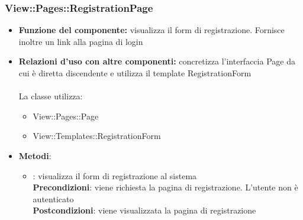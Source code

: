 \subsubsection{View::Pages::RegistrationPage}
\begin{itemize}
\item\textbf{Funzione del componente:} visualizza il form di registrazione. Fornisce inoltre un link alla pagina di login
				\item\textbf{Relazioni d'uso con altre componenti:} concretizza l'interfaccia Page da cui è diretta discendente e utilizza il template RegistrationForm\\ \\
La classe utilizza:
	\begin{itemize}
		\item View::Pages::Page\\
		\item View::Templates::RegistrationForm\\
	\end{itemize}
\item\textbf{Metodi}:
	\begin{itemize}
		\item{}: visualizza il form di registrazione al sistema\\
		\textbf{Precondizioni}: viene richiesta la pagina di registrazione. L'utente non è autenticato\\
		\textbf{Postcondizioni}: viene visualizzata la pagina di registrazione\\
	\end{itemize}
\end{itemize}

